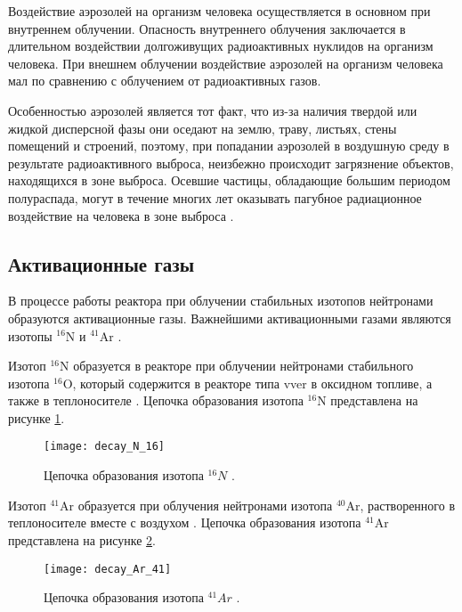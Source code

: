 Воздействие аэрозолей на организм человека осуществляется в основном при внутреннем облучении. Опасность внутреннего 
облучения заключается в длительном воздействии долгоживущих радиоактивных нуклидов на организм человека. При внешнем 
облучении воздействие аэрозолей на организм человека мал по сравнению с облучением от радиоактивных газов.

Особенностью аэрозолей является тот факт, что из-за наличия твердой или жидкой дисперсной фазы они оседают на землю, 
траву, листьях, стены помещений и строений, поэтому, при попадании аэрозолей в воздушную среду в результате 
радиоактивного выброса, неизбежно происходит загрязнение объектов, находящихся в зоне выброса. Осевшие частицы, 
обладающие большим периодом полураспада, могут в течение многих лет оказывать пагубное радиационное воздействие на 
человека в зоне выброса \cite{nuc_waste}.

\subsection{Активационные газы}

В процессе работы реактора при облучении стабильных изотопов нейтронами образуются активационные газы. Важнейшими 
активационными газами являются изотопы $^{16}\text{N}$ и $^{41}\text{Ar}$ \cite{gusev_bio}. 

Изотоп $^{16}\text{N}$ образуется в реакторе при облучении нейтронами стабильного изотопа $^{16}\text{O}$, который 
содержится в реакторе типа \ac{vver} в оксидном топливе, а также в теплоносителе \cite{gusev_bio}. Цепочка образования 
изотопа $^{16}\text{N}$ представлена на рисунке \ref{fig_N_16_decay}.

\begin{figure}[ht!]
    \centering
    \texttt{[image: decay\_N\_16]}
    \captionsetup{justification=centering}
    \caption{Цепочка образования изотопа $^{16}N$ \cite{periodic_table}.}
    \label{fig_N_16_decay}
\end{figure}

Изотоп $^{41}\text{Ar}$ образуется при облучения нейтронами изотопа $^{40}\text{Ar}$, растворенного в теплоносителе 
вместе с воздухом \cite{gusev_bio}. Цепочка образования изотопа $^{41}\text{Ar}$ представлена на рисунке 
\ref{fig_Ar_41_decay}.

\begin{figure}[ht!]
    \centering
    \texttt{[image: decay\_Ar\_41]}
    \captionsetup{justification=centering}
    \caption{Цепочка образования изотопа $^{41}Ar$ \cite{periodic_table}.}
    \label{fig_Ar_41_decay}
\end{figure}

